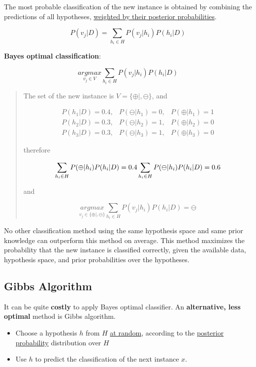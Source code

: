 The most probable classification of the new instance is obtained by
combining the predictions of all hypotheses, \ul{weighted by their
posterior probabilities}.

\[P(v_j|D)=\sum_{h_i\in H}P(v_j|h_i)P(h_i|D)\]

\textbf{Bayes optimal classification}:

\[\underset{v_j\in V}{argmax}\sum_{h_i\in H}P(v_j|h_i)P(h_i|D)\]

\begin{quote}
The set of the new instance is \(V=\{\oplus|,\ominus\}\), and

\begin{equation*}
\begin{aligned}
P(h_1|D)=0.4,&P(\ominus|h_1)=0,&P(\oplus|h_1)=1\\
P(h_2|D)=0.3,&P(\ominus|h_2)=1,&P(\oplus|h_2)=0\\
P(h_3|D)=0.3,&P(\ominus|h_3)=1,&P(\oplus|h_3)=0
\end{aligned}
\end{equation*}


therefore

\[\sum_{h_i\in H}P(\oplus|h_i)P(h_i|D)=0.4\\
\sum_{h_i\in H}P(\ominus|h_i)P(h_i|D)=0.6\]

and

\[\underset{v_j\in\{\oplus|,\ominus\}}{argmax}\sum_{h_i\in H}P(v_j|h_i)P(h_i|D)=\ominus\]
\end{quote}

No other classification method using the same hypothesis space and same
prior knowledge can outperform this method on average. This method
maximizes the probability that the new instance is classified correctly,
given the available data, hypothesis space, and prior probabilities over
the hypotheses.

\hypertarget{gibbs-algorithm}{%
\subsection{Gibbs Algorithm}\label{gibbs-algorithm}}

It can be quite \textbf{costly} to apply Bayes optimal classifier. An
\textbf{alternative, less optimal} method is Gibbs algorithm.

\begin{itemize}
\item
  Choose a hypothesis \(h\) from \(H\) \ul{at random}, according to the
  \ul{posterior probability} distribution over \(H\)
\item
  Use \(h\) to predict the classification of the next instance \(x\).
\end{itemize}

